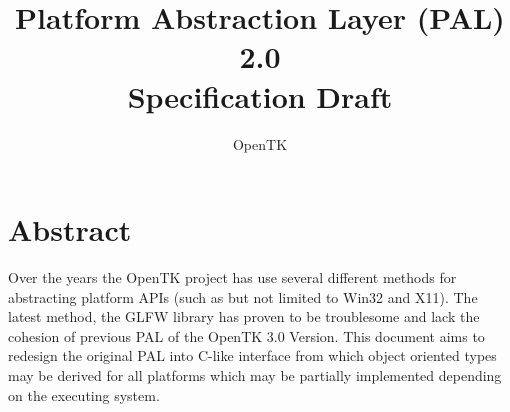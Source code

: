 \documentclass[a4paper, 12pt]{article}
\title{
    Platform Abstraction Layer (PAL) 2.0\\
    {\large Specification Draft}
}
\author{OpenTK}
\begin{document}
\maketitle

\section*{Abstract}
Over the years the OpenTK project has use several different methods for
abstracting platform APIs (such as but not limited to Win32 and X11). The latest
method, the GLFW library has proven to be troublesome and lack the cohesion of
previous PAL of the OpenTK 3.0 Version. This document aims to redesign the
original PAL into C-like interface from which object oriented types may be
derived for all platforms which may be partially implemented depending on the
executing system.
\end{document}
